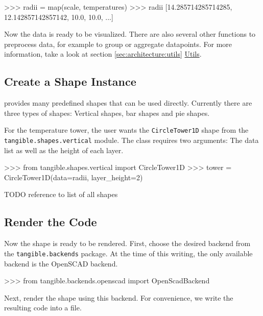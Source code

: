 \vspace{.5\baselineskip}
\begin{pythoncode}
>>> radii = map(scale, temperatures)
>>> radii
[14.285714285714285, 12.142857142857142, 10.0, 10.0, ...]
\end{pythoncode}

\noindent Now the data is ready to be visualized. There are also several other
functions to preprocess data, for example to group or aggregate datapoints. For
more information, take a look at section \ref{sec:architecture:utils}
\hyperref[sec:architecture:utils]{Utils}.

\subsection{Create a Shape Instance}

\tangible{} provides many predefined shapes that can be used directly. Currently
there are three types of shapes: Vertical shapes, bar shapes and pie shapes.

For the temperature tower, the user wants the \texttt{CircleTower1D} shape from
the \texttt{tangible.shapes.vertical} module. The class requires two arguments:
The data list as well as the height of each layer.

\vspace{.5\baselineskip}
\begin{pythoncode}
>>> from tangible.shapes.vertical import CircleTower1D
>>> tower = CircleTower1D(data=radii, layer_height=2)
\end{pythoncode}

TODO reference to list of all shapes

\subsection{Render the Code}

Now the shape is ready to be rendered. First, choose the desired backend from
the \texttt{tangible.backends} package. At the time of this writing, the only
available backend is the OpenSCAD backend.

\vspace{.5\baselineskip}
\begin{pythoncode}
>>> from tangible.backends.openscad import OpenScadBackend
\end{pythoncode}

\noindent Next, render the shape using this backend. For convenience, we write
the resulting code into a file.

